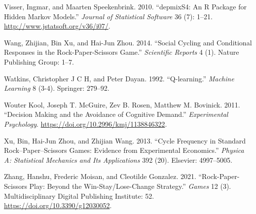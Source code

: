 \documentclass[smallextended]{svjour3}       %
\begin{document}
\leavevmode\hypertarget{ref-R-depmixS4}{}%
Visser, Ingmar, and Maarten Speekenbrink. 2010. ``depmixS4: An R Package
for Hidden Markov Models.'' \emph{Journal of Statistical Software} 36
(7): 1--21. \url{http://www.jstatsoft.org/v36/i07/}.

\leavevmode\hypertarget{ref-wang2014social}{}%
Wang, Zhijian, Bin Xu, and Hai-Jun Zhou. 2014. ``Social Cycling and
Conditional Responses in the Rock-Paper-Scissors Game.''
\emph{Scientific Reports} 4 (1). Nature Publishing Group: 1--7.

\leavevmode\hypertarget{ref-watkins1992q}{}%
Watkins, Christopher J C H, and Peter Dayan. 1992. ``Q-learning.''
\emph{Machine Learning} 8 (3-4). Springer: 279--92.

\leavevmode\hypertarget{ref-Kool_2011}{}%
Wouter Kool, Joseph T. McGuire, Zev B. Rosen, Matthew M. Bovinick. 2011.
``Decision Making and the Avoidance of Cognitive Demand.''
\emph{Experimental Psychology}.
\url{https://doi.org/10.2996/kmj/1138846322}.

\leavevmode\hypertarget{ref-xu2013cycle}{}%
Xu, Bin, Hai-Jun Zhou, and Zhijian Wang. 2013. ``Cycle Frequency in
Standard Rock--Paper--Scissors Games: Evidence from Experimental
Economics.'' \emph{Physica A: Statistical Mechanics and Its
Applications} 392 (20). Elsevier: 4997--5005.

\leavevmode\hypertarget{ref-zhang_rock-paper-scissors_2021}{}%
Zhang, Hanshu, Frederic Moisan, and Cleotilde Gonzalez. 2021.
``Rock-Paper-Scissors Play: Beyond the Win-Stay/Lose-Change Strategy.''
\emph{Games} 12 (3). Multidisciplinary Digital Publishing Institute: 52.
\url{https://doi.org/10.3390/g12030052}.




\end{document}
